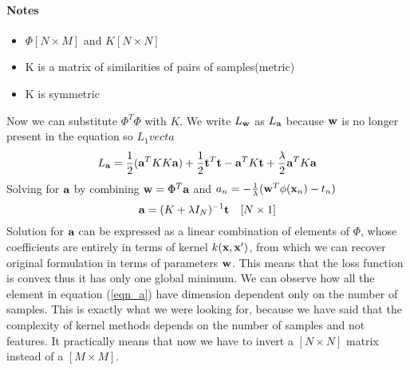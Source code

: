 \documentclass[main.tex]{subfiles}
\begin{document}
\paragraph{Notes} 
\begin{itemize}
    \item $\Phi [N \times M]$ and $K [N \times N]$
    \item K is a matrix of similarities of pairs of samples(metric)
    \item K is symmetric
\end{itemize}
Now we can substitute $\Phi^T \Phi$ with $K$. We write $L_{\textbf{w}}$ as $L_{\textbf{a}}$ because $\textbf{w}$ is no longer present in the equation so $L_1vect{a}$
\begin{equation*}
    L_{\textbf{a}} = \frac{1}{2}(\textbf{a}^T K K \textbf{a}) + \frac{1}{2}\textbf{t}^T \textbf{t} - \textbf{a}^T K \textbf{t} +\frac{\lambda}{2} \textbf{a}^T K \textbf{a}
\end{equation*}
Solving for $\textbf{a}$ by combining $\textbf{w}=\Phi^T \textbf{a}$ and $a_n=-\frac{1}{\lambda}(\textbf{w}^T \phi(\textbf{x}_n)-t_n)$
\begin{equation}
    \textbf{a} = (K + \lambda I_N)^{-1} \textbf{t} \quad [N \times 1]
\end{equation} \label{eqn_a}
Solution for $\textbf{a}$ can be expressed as a linear combination of elements of $\Phi$, whose coefficients are entirely in terms of kernel $k(\textbf{x},\textbf{x}')$, from
which we can recover original formulation in terms of parameters $\textbf{w}$. This means that the loss function is convex thus it has only one global minimum. We can observe how all the element in equation (\ref{eqn_a}) have dimension dependent only on the number of samples. This is exactly what we were looking for, because we have said that the complexity of kernel methods depends on the number of samples and not features. It practically means that now we have to invert a $[N \times N]$ matrix instead of a $[M \times M]$.
\end{document}
